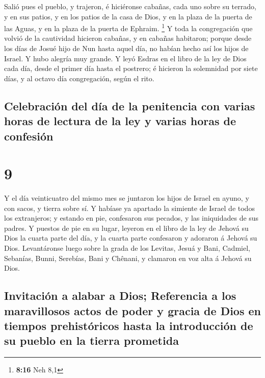  Salió pues el pueblo, y trajeron, é hiciéronse cabañas,
cada uno sobre su terrado, y en sus patios, y en los patios de la casa
de Dios, y en la plaza de la puerta de las Aguas, y en la plaza de la
puerta de Ephraim. \footnote{\textbf{8:16} Neh 8,1}  Y toda
la congregación que volvió de la cautividad hicieron cabañas, y en
cabañas habitaron; porque desde los días de Josué hijo de Nun hasta
aquel día, no habían hecho así los hijos de Israel. Y hubo alegría muy
grande.  Y leyó Esdras en el libro de la ley de Dios cada
día, desde el primer día hasta el postrero; é hicieron la solemnidad por
siete días, y al octavo día congregación, según el rito.

\hypertarget{celebraciuxf3n-del-duxeda-de-la-penitencia-con-varias-horas-de-lectura-de-la-ley-y-varias-horas-de-confesiuxf3n}{%
\subsection{Celebración del día de la penitencia con varias horas de
lectura de la ley y varias horas de
confesión}\label{celebraciuxf3n-del-duxeda-de-la-penitencia-con-varias-horas-de-lectura-de-la-ley-y-varias-horas-de-confesiuxf3n}}

\hypertarget{section-8}{%
\section{9}\label{section-8}}

 Y el día veinticuatro del mismo mes se juntaron los hijos
de Israel en ayuno, y con sacos, y tierra sobre sí.  Y
habíase ya apartado la simiente de Israel de todos los extranjeros; y
estando en pie, confesaron sus pecados, y las iniquidades de sus padres.
 Y puestos de pie en su lugar, leyeron en el libro de la ley
de Jehová su Dios la cuarta parte del día, y la cuarta parte confesaron
y adoraron á Jehová su Dios.  Levantáronse luego sobre la
grada de los Levitas, Jesuá y Bani, Cadmiel, Sebanías, Bunni, Serebías,
Bani y Chênani, y clamaron en voz alta á Jehová su Dios.

\hypertarget{invitaciuxf3n-a-alabar-a-dios-referencia-a-los-maravillosos-actos-de-poder-y-gracia-de-dios-en-tiempos-prehistuxf3ricos-hasta-la-introducciuxf3n-de-su-pueblo-en-la-tierra-prometida}{%
\subsection{Invitación a alabar a Dios; Referencia a los maravillosos
actos de poder y gracia de Dios en tiempos prehistóricos hasta la
introducción de su pueblo en la tierra
prometida}\label{invitaciuxf3n-a-alabar-a-dios-referencia-a-los-maravillosos-actos-de-poder-y-gracia-de-dios-en-tiempos-prehistuxf3ricos-hasta-la-introducciuxf3n-de-su-pueblo-en-la-tierra-prometida}}

